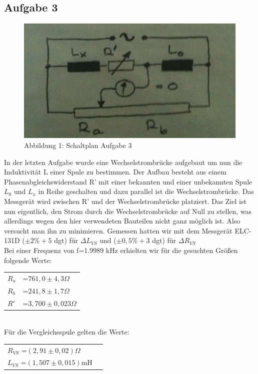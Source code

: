 \subsection{Aufgabe 3}
\begin{figure}[H]
\includegraphics[scale=0.5]{sb3}
\caption{Abbildung 1: Schaltplan Aufgabe 3}
\end{figure}
In der letzten Aufgabe wurde eine Wechselstrombrücke aufgebaut um nun die Induktivität L einer Spule zu bestimmen. Der Aufbau besteht aus einem Phasenabgleichswiderstand R' mit einer bekannten und einer unbekannten Spule \(L_{0}\) und \(L_{x}\) in Reihe geschalten und dazu parallel ist die Wechselstrombrücke. Das Messgerät wird zwischen R' und der Wechselstrombrücke platziert. Das Ziel ist nun eigentlich, den Strom durch die Wechselstrombrücke auf Null zu stellen, was allerdings wegen den hier verwendeten Bauteilen nicht ganz möglich ist. Also versucht man ihn zu minimieren. Gemessen hatten wir mit dem Messgerät ELC-131D (\(\pm 2\% +5\) dgt) für \(\Delta L_{VS}\) und (\(\pm 0,5\% +3\) dgt) für \(\Delta R_{VS}\)\\
Bei einer Frequenz von f=1.9989 kHz erhielten wir für die gesuchten Größen folgende Werte:
\\

\begin{tabular}{l l}
\(R_{a}\) & =\(761,0\pm 4,3 \Omega\)\\
\(R_{b}\) & =\(241,8\pm 1,7 \Omega\)\\
\(R'\) & =\(3,700\pm 0,023 \Omega\)\\
\end{tabular}
\\

Für die Vergleichsspule gelten die Werte:\\

\begin{tabular}{l l}
\(R_{VS}\) =\((2,91\pm 0,02)\Omega\)\\
\(L_{VS}\) =\((1,507\pm 0,015)\)mH\\
\end{tabular}
\\

